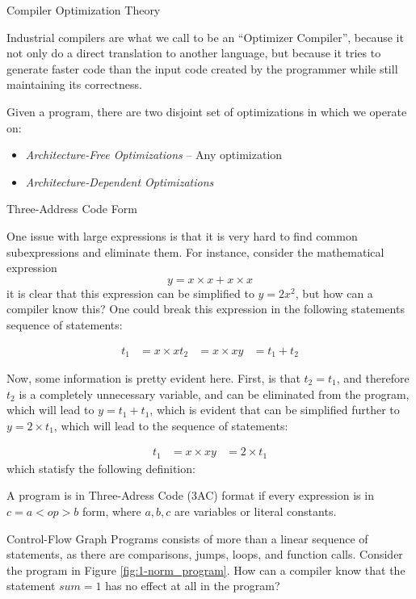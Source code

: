 \begin{section}{Compiler Optimization Theory}

Industrial compilers are what we call to be an ``Optimizer Compiler'', because
it not only do a direct translation to another language, but because it
tries to generate faster code than the input code created by the programmer
while still maintaining its correctness.

Given a program, there are two disjoint set of optimizations in which we
operate on:
\begin{itemize}
	\item \textit{Architecture-Free Optimizations} -- Any optimization
	\item \textit{Architecture-Dependent Optimizations}
\end{itemize}

\begin{subsubsection}{Three-Address Code Form}

One issue with large expressions is that it is very hard to find common
subexpressions and eliminate them. For instance, consider the mathematical
expression
$$y = x \times x + x \times x $$
it is clear that this expression can be simplified to $y = 2x^2$, but how
can a compiler know this? One could break this expression in the following
statements sequence of statements:

\begin{align}
t_1 &= x \times x
t_2 &= x \times x
y &= t_1 + t_2
\end{align}

Now, some information is pretty evident here. First, is that $t_2 = t_1$,
and therefore $t_2$ is a completely unnecessary variable, and can be
eliminated from the program, which will lead to $y = t_1 + t_1$, which is
evident that can be simplified further to $y = 2 \times t_1$, which will lead
to the sequence of statements:

\begin{align}
t_1 &= x \times x
y &= 2 \times t_1
\end{align}
which statisfy the following definition:
\begin{definition}
	A program is in Three-Adress Code (3AC) format if every expression is
	in $c = a <op> b$ form, where $a, b, c$ are variables or
	literal constants.
\end{definition}

\end{subsubsection}

\begin{subsubsection}{Control-Flow Graph}
	Programs consists of more than a linear sequence of statements, as there are
	comparisons, jumps, loops, and function calls. Consider the program in
	Figure \ref{fig:1-norm_program}. How can a compiler know that the statement
	$\textit{sum} = 1$ has no effect at all in the program?


\end{subsubsection}
\end{section}
